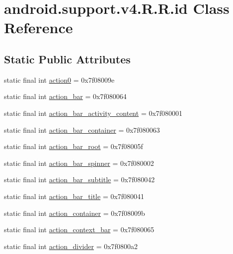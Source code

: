 \hypertarget{classandroid_1_1support_1_1v4_1_1_r_1_1id}{
\section{android.support.v4.R.R.id Class Reference}
\label{classandroid_1_1support_1_1v4_1_1_r_1_1id}
}
\subsection*{Static Public Attributes}
\begin{CompactItemize}
\item 
static final int \hyperlink{classandroid_1_1support_1_1v4_1_1_r_1_1id_85ee1eff2a0e5e979ff6437daeb9370b}{action0} = 0x7f08009e
\item 
static final int \hyperlink{classandroid_1_1support_1_1v4_1_1_r_1_1id_66571409e044861b01fd10bf2f56f731}{action\_\-bar} = 0x7f080064
\item 
static final int \hyperlink{classandroid_1_1support_1_1v4_1_1_r_1_1id_bb9d4f45676defa37a4b24184eeefad6}{action\_\-bar\_\-activity\_\-content} = 0x7f080001
\item 
static final int \hyperlink{classandroid_1_1support_1_1v4_1_1_r_1_1id_dc250103f05b9fd0792dd1e6582f7c23}{action\_\-bar\_\-container} = 0x7f080063
\item 
static final int \hyperlink{classandroid_1_1support_1_1v4_1_1_r_1_1id_cf9f148044b71b6af49257efe30d7909}{action\_\-bar\_\-root} = 0x7f08005f
\item 
static final int \hyperlink{classandroid_1_1support_1_1v4_1_1_r_1_1id_7fad0fc1e933a1a6ae9217cfe2646df7}{action\_\-bar\_\-spinner} = 0x7f080002
\item 
static final int \hyperlink{classandroid_1_1support_1_1v4_1_1_r_1_1id_a72de7fa29cd46eb37a68befa8b6f081}{action\_\-bar\_\-subtitle} = 0x7f080042
\item 
static final int \hyperlink{classandroid_1_1support_1_1v4_1_1_r_1_1id_bb51cf626ce834b5ed42932e1812c753}{action\_\-bar\_\-title} = 0x7f080041
\item 
static final int \hyperlink{classandroid_1_1support_1_1v4_1_1_r_1_1id_388faa3649b5141f6a7d638739918b46}{action\_\-container} = 0x7f08009b
\item 
static final int \hyperlink{classandroid_1_1support_1_1v4_1_1_r_1_1id_590087337710e8c4e80eeb581f61b516}{action\_\-context\_\-bar} = 0x7f080065
\item 
static final int \hyperlink{classandroid_1_1support_1_1v4_1_1_r_1_1id_5139aee4c3b9250e20f3fccb1ada8a58}{action\_\-divider} = 0x7f0800a2

\end{CompactItemize}
